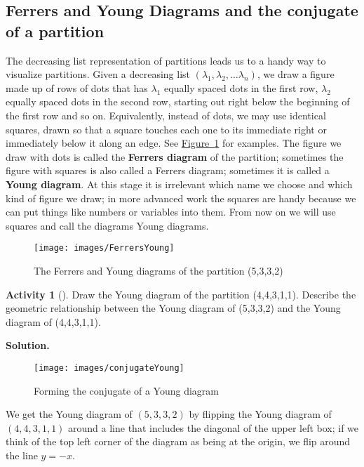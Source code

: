 \documentclass[10pt,]{book}
\newcommand{\terminology}[1]{\textbf{#1}}
\theoremstyle{plain}
\theoremstyle{definition}
\newtheorem{activity}[project]{Activity}
\numberwithin{equation}{chapter}
\begin{document}
\subsection[{Ferrers and Young Diagrams and the conjugate of a partition}]{Ferrers and Young Diagrams and the conjugate of a partition}\label{subsection-32}
The decreasing list representation of partitions leads us to a handy way to visualize partitions. Given a decreasing list \((\lambda_1,\lambda_2,\ldots \lambda_n)\), we draw a figure made up of rows of dots that has \(\lambda_1\) equally spaced dots in the first row, \(\lambda_2\) equally spaced dots in the second row, starting out right below the beginning of the first row and so on. Equivalently, instead of dots, we may use identical squares, drawn so that a square touches each one to its immediate right or immediately below it along an edge. See \hyperref[FerrersYoung]{Figure~\ref{FerrersYoung}} for examples. The figure we draw with dots is called the \terminology{Ferrers diagram} of the partition; sometimes the figure with squares is also called a Ferrers diagram; sometimes it is called a \terminology{Young diagram}. At this stage it is irrelevant which name we choose and which kind of figure we draw; in more advanced work the squares are handy because we can put things like numbers or variables into them.  From now on we will use squares and call the diagrams Young diagrams.%
\begin{figure}
\centering
\texttt{[image: images/FerrersYoung]}
\caption{The Ferrers and Young diagrams of the partition (5,3,3,2)\label{FerrersYoung}}
\end{figure}
\begin{activity}[]\label{activity-86}
Draw the Young diagram of the partition (4,4,3,1,1). Describe the geometric relationship between the Young diagram of (5,3,3,2) and the Young diagram of (4,4,3,1,1).%
\par\medskip\noindent%
\textbf{Solution.}\quad \leavevmode%
\begin{figure}
\centering
\texttt{[image: images/conjugateYoung]}
\caption{Forming the conjugate of a Young diagram\label{conjugateYoung}}
\end{figure}
We get the Young diagram of \((5,3,3,2)\) by flipping the Young diagram of \((4,4,3,1,1)\) around a line that includes the diagonal of the upper left box; if we think of the top left corner of the diagram as being at the origin, we flip around the line \(y=-x\).%
\end{activity}
\end{document}
